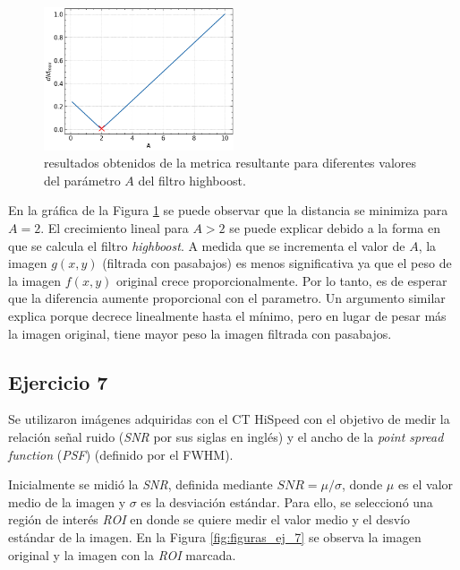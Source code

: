 \documentclass[11pt, twocolumn]{article}
\begin{document}
\begin{figure} [htbp]
  \centering
  \includegraphics[width=0.5\textwidth]{images/ej_6/distance.png}
  \caption{resultados obtenidos de la metrica resultante para diferentes valores del parámetro $A$ del filtro highboost.}
  \label{fig:distance}
\end{figure}

En la gráfica de la Figura \ref{fig:distance} se puede observar que la distancia se minimiza para $A = 2$. El crecimiento lineal para $A > 2$ se puede explicar debido a la forma en que se calcula el filtro \textit{highboost}. A medida que se incrementa el valor de $A$, la imagen $g(x, y)$ (filtrada con pasabajos) es menos significativa ya que el peso de la imagen $f(x, y)$ original crece proporcionalmente. Por lo tanto, es de esperar que la diferencia aumente proporcional con el parametro. Un argumento similar explica porque decrece linealmente hasta el mínimo, pero en lugar de pesar más la imagen original, tiene mayor peso la imagen filtrada con pasabajos.

\subsection*{Ejercicio 7}

Se utilizaron imágenes adquiridas con el CT HiSpeed con el objetivo de medir la relación señal ruido (\textit{SNR} por sus siglas en inglés) y el ancho de la \textit{point spread function} (\textit{PSF}) (definido por el FWHM). 

Inicialmente se midió la \textit{SNR}, definida mediante $SNR = \mu / \sigma$, donde $\mu$ es el valor medio de la imagen y $\sigma$ es la desviación estándar. Para ello, se seleccionó una región de interés \textit{ROI} en donde se quiere medir el valor medio y el desvío estándar de la imagen. En la Figura \ref{fig:figuras_ej_7} se observa la imagen original y la imagen con la \textit{ROI} marcada.
\end{document}
